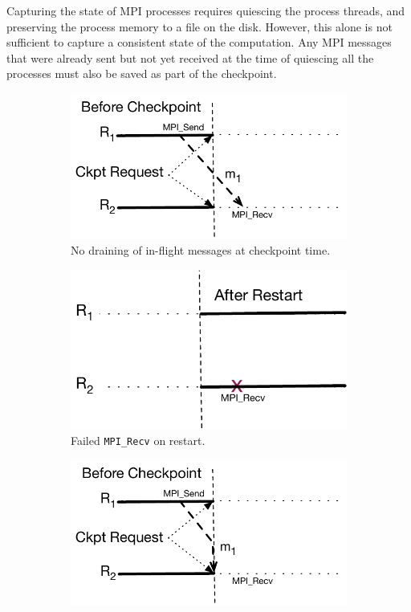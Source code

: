 \documentclass[11pt,letter]{article}
\begin{document}
Capturing the state of MPI processes requires quiescing the process threads,
and preserving the process memory to a file on the disk. However, this alone
is not sufficient to capture a consistent state of the computation. Any MPI
messages that were already sent but not yet received at the time of quiescing
all the processes must also be saved as part of the checkpoint.

\begin{figure}[t!]
  \centering
  \begin{subfigure}[t]{0.20\textwidth}
    \includegraphics[scale=0.38]{figures/mpiDrainAlgo1}
    \caption{No draining of in-flight messages at checkpoint time.}
  \end{subfigure}\hfill%
  \begin{subfigure}[t]{0.20\textwidth}
    \includegraphics[scale=0.38]{figures/mpiDrainAlgo2}
    \caption{Failed \texttt{MPI\_Recv} on restart.}
  \end{subfigure}\hfill%
  \begin{subfigure}[t]{0.20\textwidth}
    \includegraphics[scale=0.38]{figures/mpiDrainAlgo3}

\end{subfigure}
\end{figure}
\end{document}
